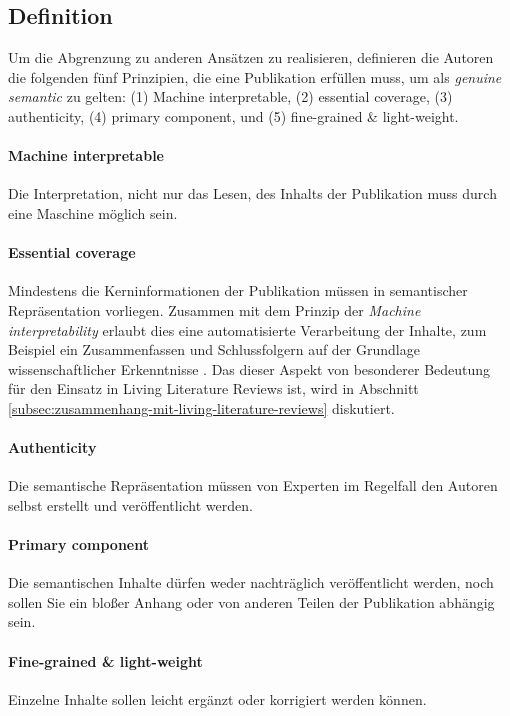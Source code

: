 \subsection{Definition}
\label{subsec:definition}

Um die Abgrenzung zu anderen Ansätzen zu realisieren, definieren die Autoren die folgenden fünf Prinzipien, die eine Publikation erfüllen muss, um als \textit{genuine semantic} zu gelten: (1) Machine interpretable, (2) essential coverage, (3) authenticity, (4) primary component, und (5) fine-grained \& light-weight.

\paragraph{Machine interpretable}
\label{par:machine-interpretable}
Die Interpretation, nicht nur das Lesen, des Inhalts der Publikation muss durch eine Maschine möglich sein.

\paragraph{Essential coverage}
\label{par:essential-coverage}
Mindestens die Kerninformationen der Publikation müssen in semantischer Repräsentation vorliegen.
Zusammen mit dem Prinzip der \textit{Machine interpretability} erlaubt dies eine automatisierte Verarbeitung der Inhalte, zum Beispiel ein Zusammenfassen und Schlussfolgern auf der Grundlage wissenschaftlicher Erkenntnisse \cite{kuhn2017genuine}.
Das dieser Aspekt von besonderer Bedeutung für den Einsatz in Living Literature Reviews ist, wird in Abschnitt \ref{subsec:zusammenhang-mit-living-literature-reviews} diskutiert.

\paragraph{Authenticity}
\label{par:authenticity}
Die semantische Repräsentation müssen von Experten \textemdash im Regelfall den Autoren selbst \textemdash erstellt und veröffentlicht werden.

\paragraph{Primary component}
\label{par:primary-component}
Die semantischen Inhalte dürfen weder nachträglich veröffentlicht werden, noch sollen Sie ein bloßer Anhang oder von anderen Teilen der Publikation abhängig sein.

\paragraph{Fine-grained \& light-weight}
\label{par:fine-grained-light-weight}
Einzelne Inhalte sollen leicht ergänzt oder korrigiert werden können.

